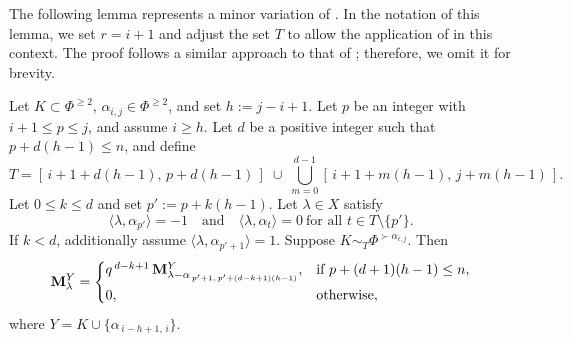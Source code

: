 The following lemma represents a minor variation of . In the notation of this lemma, we set $r=i+1$ and adjust the set $T$ to allow the application of  in this context. The proof follows a similar approach to that of ; therefore, we omit it for brevity.

\begin{lemma}\rm\label{Claim: free Q2}
Let $K \subset \Phi^{\geq 2}$, $\alpha_{i,j} \in \Phi^{\geq 2}$, and set $h:=j-i+1$.
Let $p$ be an integer with $i+1 \le p \le j$, and assume $i\geq h$.
Let $d$ be a positive integer such that $p+d(h-1)\le n$, and define
\begin{equation}
T = [\,i+1+d(h-1),\, p+d(h-1)\,] \;\cup\;
\bigcup_{m=0}^{d-1} [\,i+1+m(h-1),\, j+m(h-1)\,].
\end{equation}
Let $0\leq k\leq d$ and set $p':=p+k(h-1)$.
Let $\lambda \in X$ satisfy
\begin{equation}
\langle \lambda,\alpha_{p'}\rangle=-1
\quad\text{and}\quad
\langle \lambda,\alpha_t\rangle=0 \ \text{for all } t\in T\setminus\{p'\}.
\end{equation}
If $k<d$, additionally assume $\langle \lambda,\alpha_{p'+1}\rangle=1$.
Suppose $K \sim_T \Phi^{\succ \alpha_{i,j}}$.
Then
\begin{equation}
\mathbf{M}_{\lambda}^{Y} =
\begin{cases}
q^{\,d-k+1}\,
\mathbf{M}_{\lambda - \alpha_{\,p'+1,\, p'+(d-k+1)(h-1)}}^{Y}, &
\text{if } p+(d+1)(h-1)\le n,\\[4pt]
0, & \text{otherwise},
\end{cases}
\end{equation}
where $Y = K \cup \{\alpha_{\,i-h+1,\, i}\}$.
\end{lemma}





